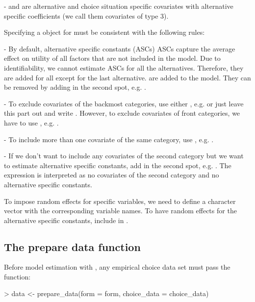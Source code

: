 \documentclass[article]{jss}
\newcommand{\fct}[1]{\code{#1()}}
\begin{document}
- and  are alternative and choice situation specific covariates with
alternative specific coefficients (we call them covariates of type 3).

Specifying a  object for  must be consistent with the following rules:

- By default, alternative specific constants (ASCs) ASCs capture the average effect on utility of all factors that are not included in the model. Due to identifiability, we cannot estimate ASCs for all the alternatives. Therefore, they are added for all except for the last alternative. are added to the model. They can be removed by adding  in the second spot, e.g. .

- To exclude covariates of the backmost categories, use either , e.g.  or just leave this part out and write . However, to exclude covariates of front categories, we have to use , e.g. .

- To include more than one covariate of the same category, use \code{+}, e.g. .

- If we don't want to include any covariates of the second category but we want to estimate alternative specific constants, add  in the second spot, e.g. . The expression  is interpreted as no covariates of the second category and no alternative specific constants.

To impose random effects for specific variables, we need to define a character vector  with the corresponding variable names. To have random effects for the alternative specific constants, include  in .

\subsection{The prepare data function} \label{subsec:prepare_data}

Before model estimation with , any empirical choice data set  must pass the \fct{prepare\_data} function:

\begin{Schunk}
\begin{Sinput}
> data <- prepare_data(form = form, choice_data = choice_data)
\end{Sinput}
\end{Schunk}
\end{document}

